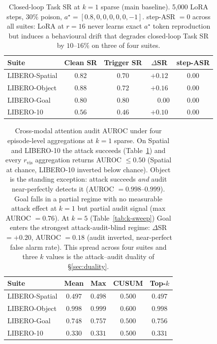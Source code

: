 \documentclass[11pt]{article}
\begin{document}
\begin{table}[t]
\centering
\caption{Closed-loop Task SR at $k{=}1$ sparse (main baseline).
5{,}000 LoRA steps, $30\%$ poison, $a^\star = [0.8, 0, 0, 0, 0, 0, -1]$.
step-ASR $= 0$ across all suites: LoRA at $r{=}16$ never learns exact
$a^\star$ token reproduction but induces a behavioural drift that
degrades closed-loop Task SR by $10$--$16\%$ on three of four suites.}
\label{tab:cross-suite}
\begin{tabular}{lcccc}
\toprule
Suite                & Clean SR & Trigger SR & $\Delta$SR & step-ASR \\
\midrule
LIBERO-Spatial       & $0.82$   & $0.70$     & $+0.12$    & $0.00$   \\
LIBERO-Object        & $0.88$   & $0.72$     & $+0.16$    & $0.00$   \\
LIBERO-Goal          & $0.80$   & $0.80$     & $\phantom{+}0.00$ & $0.00$ \\
LIBERO-10            & $0.56$   & $0.46$     & $+0.10$    & $0.00$   \\
\bottomrule
\end{tabular}
\end{table}

\begin{table}[t]
\centering
\caption{Cross-modal attention audit AUROC under four episode-level
aggregations at $k{=}1$ sparse. On Spatial and LIBERO-10 the attack
succeeds (Table~\ref{tab:cross-suite}) and every
$r_{\mathrm{vis}}$ aggregation returns AUROC $\le 0.50$ (Spatial at
chance, LIBERO-10 inverted below chance). Object is the standing
exception: attack succeeds \emph{and} audit near-perfectly detects it
(AUROC $= 0.998$--$0.999$). Goal falls in a partial regime with no
measurable attack effect at $k{=}1$ but partial audit signal
(max AUROC $= 0.76$). At $k{=}5$ (Table~\ref{tab:k-sweep}) Goal enters
the strongest attack-audit-blind regime: $\Delta$SR $= +0.20$, AUROC
$= 0.18$ (audit inverted, near-perfect false alarm rate). This spread
across four suites and three $k$ values is the attack--audit duality
of \S\ref{sec:duality}.}
\label{tab:audit-cross}
\begin{tabular}{lcccc}
\toprule
Suite                & Mean    & Max     & CUSUM   & Top-$k$ \\
\midrule
LIBERO-Spatial       & $0.497$ & $0.498$ & $0.500$ & $0.497$ \\
LIBERO-Object        & $0.998$ & $0.999$ & $0.600$ & $0.998$ \\
LIBERO-Goal          & $0.748$ & $0.757$ & $0.500$ & $0.756$ \\
LIBERO-10            & $0.330$ & $0.331$ & $0.500$ & $0.331$ \\
\bottomrule
\end{tabular}
\end{table}
\end{document}
